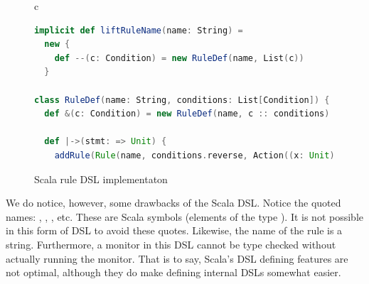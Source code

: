 \begin{figure}
\begin{center}
\begin{tabular}{c}
\begin{lstlisting}[language=scala]
implicit def liftRuleName(name: String) = 
  new { 
    def --(c: Condition) = new RuleDef(name, List(c)) 
  }

class RuleDef(name: String, conditions: List[Condition]) { 
  def &(c: Condition) = new RuleDef(name, c :: conditions)

  def |->(stmt: => Unit) { 
    addRule(Rule(name, conditions.reverse, Action((x: Unit) => stmt))) } }
\end{lstlisting}
\end{tabular}
\end{center}
\caption{Scala rule DSL implementaton}
\label{fig:dsl-scala}
\end{figure}

We do notice, however, some drawbacks of the Scala DSL.
Notice the quoted names: , , 
, etc. These are Scala symbols (elements of the type 
). It is not possible in this form of DSL to avoid 
these quotes. Likewise, the name of the rule is a string. 
Furthermore, a monitor in this DSL cannot be type checked without 
actually running the monitor. That is to say, Scala's DSL defining
features are not optimal, although they do make defining internal 
DSLs somewhat easier.
